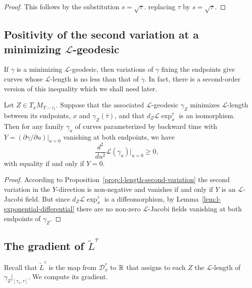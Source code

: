 \begin{proof}
\sketch This follows by the substitution $s=\sqrt{\tau}$.
replacing $\tau$ by $s=\sqrt{\tau}$.
\end{proof}

\subsection{Positivity of the second variation at a minimizing
${\mathcal L}$-geodesic}


If $\gamma$ is a minimizing ${\mathcal L}$-geodesic, then variations
of $\gamma$ fixing the endpoints  give curves whose ${\mathcal
L}$-length is no less than that of $\gamma$. In fact, there is a
second-order version of this inequality which we shall need later.

\begin{corollary}\label{cor:l-length-second-variation-positive}
\label{posform}

Let $Z\in T_xM_{T-\tau_1}$. Suppose that the associated ${\mathcal
L}$-geodesic $\gamma_Z$ minimizes ${\mathcal L}$-length between its
endpoints, $x$ and $\gamma_Z(\bar\tau)$, and that $d_Z{\mathcal
L}\exp^{\bar\tau}_x$ is an isomorphism. Then for any family
$\gamma_u$ of curves parameterized by backward time with
$Y=(\partial \gamma/\partial u)|_{u=0}$ vanishing at both endpoints,
we have
$$\frac{d^2}{du^2}{\mathcal L}(\gamma_u)|_{u=0}\ge 0,$$
with equality if and only if $Y=0$.
\end{corollary}

\begin{proof}
\sketch
{}
According to Proposition~\ref{prop:l-length-second-variation} the second variation  in the
$Y$-direction is non-negative and vanishes if and only if $Y$ is an ${\mathcal
L}$-Jacobi field. But since $d_Z{\mathcal L}\exp_x^{\bar\tau}$ is a
diffeomorphism, by Lemma~\ref{lem:l-exponential-differential} there are no non-zero ${\mathcal
L}$-Jacobi fields vanishing at both endpoints of $\gamma_Z$.
\end{proof}



\subsection{The gradient of $\widetilde L^\tau$}

Recall that $\widetilde
L^{\tau}$ is the map from ${\mathcal D}^{\tau}_x$ to $\mathbb{R}$ that
assigns to each $Z$ the ${\mathcal L}$-length of
$\gamma_Z|_{[\tau_1,\tau]}$. We compute its gradient.




